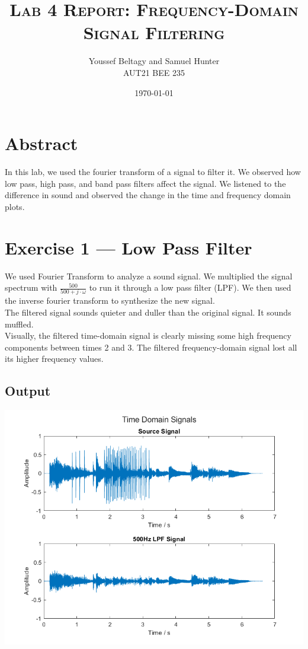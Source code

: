 \documentclass[11pt]{article}
\title{
    \textsc{Lab 4 Report: Frequency-Domain Signal Filtering}
}
\author{
    \Large{Youssef Beltagy and Samuel Hunter} \\
    \large \textsc{AUT21 BEE 235}
}
\date{\today}
\begin{document}
\maketitle %
\pagebreak


\section{Abstract}

In this lab, we used the fourier transform of a signal
to filter it. We observed how low pass, high pass, and band pass filters affect the signal.
We listened to the difference in sound and observed the change in the time and frequency domain plots.

\section{Exercise 1 --- Low Pass Filter}

We used Fourier Transform to analyze a sound signal.
We multiplied the signal spectrum with $\frac{500}{500 + j \cdot \omega}$
to run it through a low pass filter (LPF). We then used the inverse fourier transform to 
synthesize the new signal.\\

The filtered signal sounds quieter and duller than the original signal.
It sounds muffled.\\

Visually, the filtered time-domain signal is clearly missing some high frequency
components between times 2 and 3. The filtered frequency-domain signal 
lost all its higher frequency values.

\subsection{Output}

\includegraphics[height=0.5\textheight]{lpf_time.png}
\end{document}
